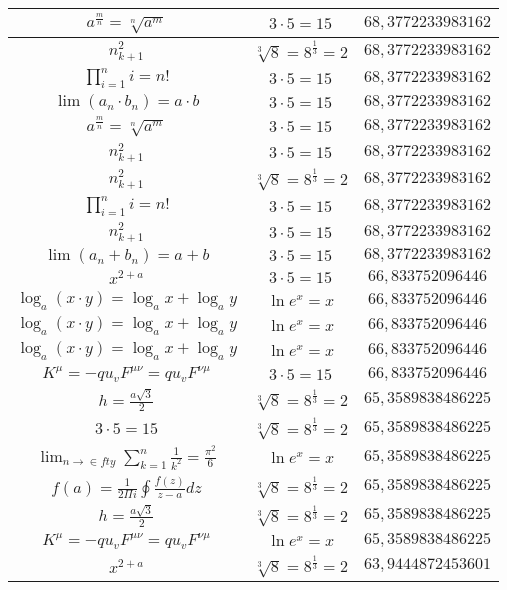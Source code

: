 \documentclass{article}
\begin{document}
\begin{flushleft}
\begin{longtable}{|c|c|c|}
$a^{\frac{m}{n}}=\sqrt[n]{a^{m}}$ & $3\cdot 5=15$ & $68,3772233983162$ \\ \hline 
$n_{k+1}^2$ & $\sqrt[3]{8}=8^{\frac{1}{3}}=2$ & $68,3772233983162$ \\ \hline 
$\prod_{i=1}^ni=n!$ & $3\cdot 5=15$ & $68,3772233983162$ \\ \hline 
$\lim\left(a_n\cdot b_n\right)=a\cdot b$ & $3\cdot 5=15$ & $68,3772233983162$ \\ \hline 
$a^{\frac{m}{n}}=\sqrt[n]{a^{m}}$ & $3\cdot 5=15$ & $68,3772233983162$ \\ \hline 
$n_{k+1}^2$ & $3\cdot 5=15$ & $68,3772233983162$ \\ \hline 
$n_{k+1}^2$ & $\sqrt[3]{8}=8^{\frac{1}{3}}=2$ & $68,3772233983162$ \\ \hline 
$\prod_{i=1}^ni=n!$ & $3\cdot 5=15$ & $68,3772233983162$ \\ \hline 
$n_{k+1}^2$ & $3\cdot 5=15$ & $68,3772233983162$ \\ \hline 
$\lim\left(a_n+b_n\right)=a+b$ & $3\cdot 5=15$ & $68,3772233983162$ \\ \hline 
$x^{2+a}$ & $3\cdot 5=15$ & $66,833752096446$ \\ \hline 
$\log_{a}(x\cdot y)=\log_{a}x+\log_{a}y$ & $\ln e^x=x$ & $66,833752096446$ \\ \hline 
$\log_{a}(x\cdot y)=\log_{a}x+\log_{a}y$ & $\ln e^x=x$ & $66,833752096446$ \\ \hline 
$\log_{a}(x\cdot y)=\log_{a}x+\log_{a}y$ & $\ln e^x=x$ & $66,833752096446$ \\ \hline 
$K^\mu=-qu_vF^{\mu\nu}=qu_vF^{\nu\mu}$ & $3\cdot 5=15$ & $66,833752096446$ \\ \hline 
$h=\frac{a\sqrt{3}}{2}$ & $\sqrt[3]{8}=8^{\frac{1}{3}}=2$ & $65,3589838486225$ \\ \hline 
$3\cdot 5=15$ & $\sqrt[3]{8}=8^{\frac{1}{3}}=2$ & $65,3589838486225$ \\ \hline 
$\lim_{n\to\in fty}\sum_{k=1}^n\frac{1}{k^2}=\frac{\pi^2}{6}$ & $\ln e^x=x$ & $65,3589838486225$ \\ \hline 
$f\left(a\right)=\frac{1}{2\Pi i}\oint\frac{f\left(z\right)}{z-a}dz$ & $\sqrt[3]{8}=8^{\frac{1}{3}}=2$ & $65,3589838486225$ \\ \hline 
$h=\frac{a\sqrt{3}}{2}$ & $\sqrt[3]{8}=8^{\frac{1}{3}}=2$ & $65,3589838486225$ \\ \hline 
$K^\mu=-qu_vF^{\mu\nu}=qu_vF^{\nu\mu}$ & $\ln e^x=x$ & $65,3589838486225$ \\ \hline 
$x^{2+a}$ & $\sqrt[3]{8}=8^{\frac{1}{3}}=2$ & $63,9444872453601$ \\ \hline 

\end{longtable}
\end{flushleft}
\end{document}
